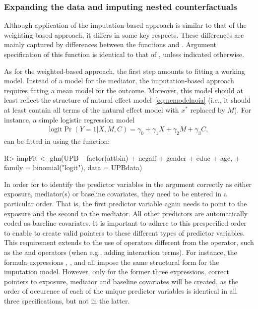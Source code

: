 \documentclass[nojss]{jss}
\begin{document}
\subsubsection[]{Expanding the data and imputing nested counterfactuals}\label{subsec:expimp}
Although application of the imputation-based approach is similar to that of the weighting-based approach, it differs in some key respects. These differences are mainly captured by differences between the functions  and . Argument specification of this function is identical to that of , unless indicated otherwise.
\par As for the weighted-based approach, the first step amounts to fitting a working model. Instead of a model for the mediator, the imputation-based approach requires fitting a mean model for the outcome. Moreover, this model should at least reflect the structure of natural effect model~\eqref{eq:nemodelnoia} (i.e., it should at least contain all terms of the natural effect model with $x^*$ replaced by $M$). For instance, a simple logistic regression model
\begin{align*}
\mbox{logit} \Pr(Y=1|X,M,C) = \gamma_0 + \gamma_1 X + \gamma_2 M + \gamma_3 C,
\end{align*}
can be fitted in  using the  function:
\begin{Schunk}
\begin{Sinput}
R> impFit <- glm(UPB ~ factor(attbin) + negaff + gender + educ + age,
+    family = binomial("logit"), data = UPBdata)
\end{Sinput}
\end{Schunk}
In order for  to identify the predictor variables in the  argument correctly as either exposure, mediator(s) or baseline covariates, they need to be entered in a particular order. That is, the first predictor variable again needs to point to the exposure and the second to the mediator. All other predictors are automatically coded as baseline covariates. It is important to adhere to this prespecified order to enable  to create valid pointers to these different types of predictor variables. This requirement extends to the use of operators different from the \code{+} operator, such as the \code{:} and \code{*} operators (when e.g., adding interaction terms). For instance, the formula expressions , ,  and  all impose the same structural form for the imputation model. However, only for the former three expressions, correct pointers to exposure, mediator and baseline covariates will be created, as the order of occurence of each of the unique predictor variables is identical in all three specifications, but not in the latter.
\end{document}
